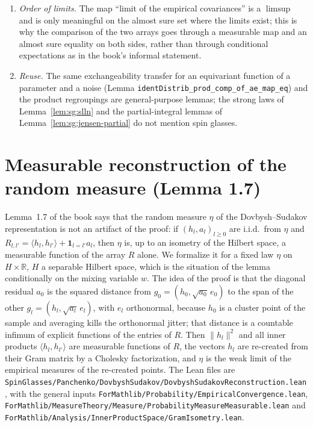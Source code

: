 \begin{remark}
\begin{enumerate}
\item \emph{Order of limits.} The map ``limit of the empirical covariances'' is a $\limsup$ and is only meaningful on the almost sure set where the limits exist; this is why the comparison of the two arrays goes through a measurable map and an almost sure equality on both sides, rather than through conditional expectations as in the book's informal statement.
\item \emph{Reuse.} The same exchangeability transfer for an equivariant function of a parameter and a noise (Lemma \texttt{identDistrib\_prod\_comp\_of\_ae\_map\_eq}) and the product regroupings are general-purpose lemmas; the strong laws of Lemma~\ref{lem:sg:slln} and the partial-integral lemmas of Lemma~\ref{lem:sg:jensen-partial} do not mention spin glasses.
\end{enumerate}
\end{remark}

\section{Measurable reconstruction of the random measure (Lemma 1.7)}\label{sec:sg:reconstruction}

Lemma~1.7 of the book says that the random measure $\eta$ of the Dovbysh--Sudakov representation is not an artifact of the proof: if $(h_l,a_l)_{l\ge0}$ are i.i.d.\ from $\eta$ and $R_{l,l'}=\langle h_l,h_{l'}\rangle+\mathbf 1_{l=l'}a_l$, then $\eta$ is, up to an isometry of the Hilbert space, a measurable function of the array $R$ alone.
We formalize it for a fixed law $\eta$ on $H\times\mathbb R$, $H$ a separable Hilbert space, which is the situation of the lemma conditionally on the mixing variable $w$.
The idea of the proof is that the diagonal residual $a_0$ is the squared distance from $g_0=(h_0,\sqrt{a_0}\,e_0)$ to the span of the other $g_l=(h_l,\sqrt{a_l}\,e_l)$, with $e_l$ orthonormal, because $h_0$ is a cluster point of the sample and averaging kills the orthonormal jitter; that distance is a countable infimum of explicit functions of the entries of $R$.
Then $\|h_l\|^2$ and all inner products $\langle h_l,h_{l'}\rangle$ are measurable functions of $R$, the vectors $h_l$ are re-created from their Gram matrix by a Cholesky factorization, and $\eta$ is the weak limit of the empirical measures of the re-created points.
The Lean files are \texttt{SpinGlasses/Panchenko/DovbyshSudakov/DovbyshSudakovReconstruction.lean}, with the general inputs \texttt{ForMathlib/Probability/EmpiricalConvergence.lean}, \texttt{ForMathlib/MeasureTheory/Measure/ProbabilityMeasureMeasurable.lean} and \texttt{ForMathlib/Analysis/InnerProductSpace/GramIsometry.lean}.

